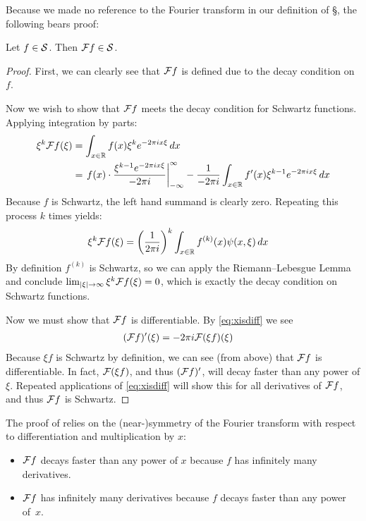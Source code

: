       Because we made no reference to the Fourier transform in our definition of \S, the following bears proof:

      \begin{lemma}
        \label{lemma:sclosed}
        Let $f\in\S$.
        Then $\F f\in\S$.
        \begin{proof}
          First, we can clearly see that $\F f$ is defined due to the decay condition on $f$.

          Now we wish to show that $\F f$ meets the decay condition for Schwartz functions.
          Applying integration by parts:
          \begin{align*}
            \xi^k\F f(\xi) &= \int_{x\in\R} f(x)\xi^ke^{-2\pi ix\xi}\,dx\\
            &= \left.f(x)\cdot\frac{\xi^{k-1}e^{-2\pi i x\xi}}{-2\pi i}\right|_{-\infty}^\infty - \frac{1}{-2\pi i}\int_{x\in\R} f'(x)\xi^{k-1}e^{-2\pi ix\xi}\,dx
          \end{align*}
          Because $f$ is Schwartz, the left hand summand is clearly zero.
          Repeating this process $k$ times yields:
          \begin{align*}
            \xi^k\F f(\xi) &= \left(\frac{1}{2\pi i}\right)^k \int_{x\in\R}f^{(k)}(x)\psi(x,\xi)\,dx
          \end{align*}
          By definition $f^{(k)}$ is Schwartz, so we can apply the Riemann--Lebesgue Lemma and conclude $\lim_{|\xi|\rightarrow\infty} \xi^k\F f(\xi) = 0$, which is exactly the decay condition on Schwartz functions.

          Now we must show that $\F f$ is differentiable. 
          By \eqref{eq:xisdiff} we see
          \begin{align*}
            (\F f)'(\xi) &= -2\pi i \F(\xi f)(\xi)
          \end{align*}
          Because $\xi f$ is Schwartz by definition, we can see (from above) that $\F f$ is differentiable.
          In fact, $\F(\xi f)$, and thus $(\F f)'$, will decay faster than any power of $\xi$.
          Repeated applications of \eqref{eq:xisdiff} will show this for all derivatives of $\F f$, and thus $\F f$ is Schwartz.
        \end{proof}
      \end{lemma}
      \begin{rmk}
        The proof of  relies on the (near-)symmetry of the Fourier transform with respect to differentiation and multiplication by $x$:
        \begin{itemize}
          \item $\F f$ decays faster than any power of $x$ because $f$ has infinitely many derivatives.
          \item $\F f$ has infinitely many derivatives because $f$ decays faster than any power of~$x$.
        \end{itemize}
      \end{rmk}

